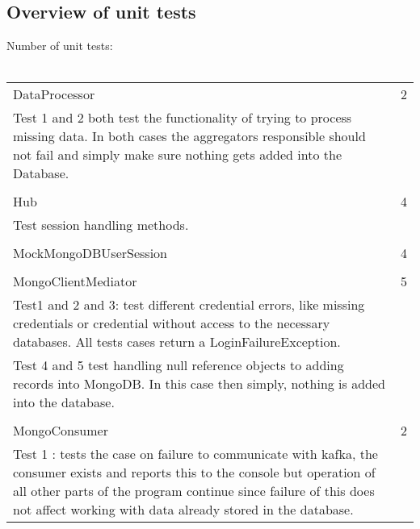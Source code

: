 \documentclass[oneside, english, final]{design}
\begin{document}
\subsection{Overview of unit tests}
Number of unit tests:\\
\hfill
\\
\begin{tabular}{|p{}p{}}
  DataProcessor             & 2                                                                                                                                                \\  Test 1 and 2 both test the functionality of trying to process missing data. In both cases the aggregators responsible should not fail and simply make sure nothing gets added into the Database.\\ \\
  Hub                       & 4                                                                                                                                                \\ Test session handling methods.\\ \\
  MockMongoDBUserSession    & 4                                                                                                                                                \\ \\
  MongoClientMediator       & 5                                                                                                                                                \\ Test1 and 2 and 3: test different credential errors, like missing credentials or credential without access to the necessary databases. All tests cases return a LoginFailureException.\\
  Test 4 and 5 test handling null reference objects to adding records into MongoDB. In this case then simply, nothing is added into the database.                              \\ \\
  MongoConsumer             & 2                                                                                                                                                \\ Test 1 : tests the case on failure to communicate with kafka, the consumer exists and reports this to the console but operation of all other parts of the program continue since failure of this does not affect working with data already stored in the database.\\

\end{tabular}
\end{document}
